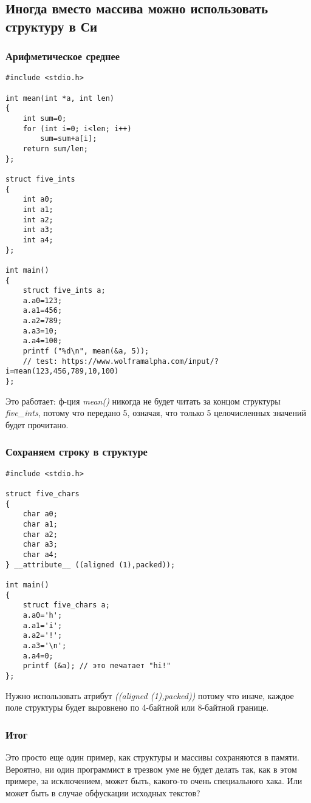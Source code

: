 \subsection{Иногда вместо массива можно использовать структуру в Си}

\subsubsection{Арифметическое среднее}

\begin{lstlisting}[style=customc]
#include <stdio.h>

int mean(int *a, int len)
{
	int sum=0;
	for (int i=0; i<len; i++)
		sum=sum+a[i];
	return sum/len;
};

struct five_ints
{
	int a0;
	int a1;
	int a2;
	int a3;
	int a4;
};

int main()
{
	struct five_ints a;
	a.a0=123;
	a.a1=456;
	a.a2=789;
	a.a3=10;
	a.a4=100;
	printf ("%d\n", mean(&a, 5));
	// test: https://www.wolframalpha.com/input/?i=mean(123,456,789,10,100)
};
\end{lstlisting}

Это работает: ф-ция \emph{mean()} никогда не будет читать за концом структуры \emph{five\_ints},
потому что передано 5, означая, что только 5 целочисленных значений будет прочитано.

\subsubsection{Сохраняем строку в структуре}

\begin{lstlisting}[style=customc]
#include <stdio.h>

struct five_chars
{
	char a0;
	char a1;
	char a2;
	char a3;
	char a4;
} __attribute__ ((aligned (1),packed));

int main()
{
	struct five_chars a;
	a.a0='h';
	a.a1='i';
	a.a2='!';
	a.a3='\n';
	a.a4=0;
	printf (&a); // это печатает "hi!"
};
\end{lstlisting}

Нужно использовать атрибут \emph{((aligned (1),packed))} потому что иначе, каждое поле структуры будет выровнено по 4-байтной
или 8-байтной границе.

\subsubsection{Итог}

Это просто еще один пример, как структуры и массивы сохраняются в памяти.
Вероятно, ни один программист в трезвом уме не будет делать так, как в этом примере, за исключением, может быть, какого-то
очень специального хака.
Или может быть в случае обфускации исходных текстов?

